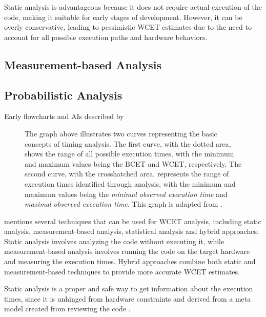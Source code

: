 Static analysis is advantageous because it does not require actual execution of the code, making it suitable for early stages of development. However, it can be overly conservative, leading to pessimistic WCET estimates due to the need to account for all possible execution paths and hardware behaviors.

\subsection{Measurement-based Analysis}
\label{sec:measurement_analysis}

\subsection{Probabilistic Analysis}
\label{sec:probabilistic_analysis}

Early flowcharts and \ac{AI}s described by \textcite{cousotAbstractInterpretationUnified1977}


\begin{figure}[htbp]
	\centering
	\resizebox{\textwidth}{!}{
		
	}
	\caption{
		The graph above illustrates two curves representing the basic concepts of timing analysis.
		The first curve, with the dotted area, shows the range of all possible execution times, with the minimum and maximum values being the \ac{BCET} and \ac{WCET}, respectively.
		The second curve, with the crosshatched area, represents the range of execution times identified through analysis, with the minimum and maximum values being the \textit{minimal observed execution time} and \textit{maximal observed execution time}.
		This graph is adapted from \textcite{wilhelmWorstcaseExecutiontimeProblem2008}.
	}
	\label{fig:overestimation}
\end{figure}

\textcite{kelterWCETAnalysisOptimization} mentions several techniques that can be used for \ac{WCET} analysis, including static analysis, measurement-based analysis, statistical analysis and hybrid approaches.
Static analysis involves analyzing the code without executing it, while measurement-based analysis involves running the code on the target hardware and measuring the execution times.
Hybrid approaches combine both static and measurement-based techniques to provide more accurate \ac{WCET} estimates.

Static analysis is a proper and safe way to get information about the execution times, since it is unhinged from hardware constraints and derived from a meta model created from reviewing the code \cite{kelterWCETAnalysisOptimization}.


